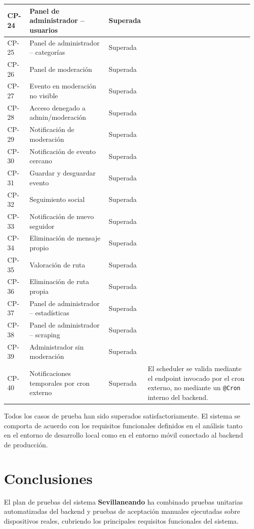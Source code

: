\begin{longtable}{|L{1.3cm}|L{4.5cm}|L{2.8cm}|L{6cm}|}
\hline
CP-24 & Panel de administrador -- usuarios & Superada & \\
\hline
CP-25 & Panel de administrador -- categorías & Superada & \\
\hline
CP-26 & Panel de moderación & Superada & \\
\hline
CP-27 & Evento en moderación no visible & Superada & \\
\hline
CP-28 & Acceso denegado a admin/moderación & Superada & \\
\hline
CP-29 & Notificación de moderación & Superada & \\
\hline
CP-30 & Notificación de evento cercano & Superada & \\
\hline
CP-31 & Guardar y desguardar evento & Superada & \\
\hline
CP-32 & Seguimiento social & Superada & \\
\hline
CP-33 & Notificación de nuevo seguidor & Superada & \\
\hline
CP-34 & Eliminación de mensaje propio & Superada & \\
\hline
CP-35 & Valoración de ruta & Superada & \\
\hline
CP-36 & Eliminación de ruta propia & Superada & \\
\hline
CP-37 & Panel de administrador -- estadísticas & Superada & \\
\hline
CP-38 & Panel de administrador -- scraping & Superada & \\
\hline
CP-39 & Administrador sin moderación & Superada & \\
\hline
CP-40 & Notificaciones temporales por cron externo & Superada & El scheduler se valida mediante el endpoint invocado por el cron externo, no mediante un \texttt{@Cron} interno del backend. \\
\hline
\end{longtable}

Todos los casos de prueba han sido superados satisfactoriamente. El sistema se comporta de acuerdo con los requisitos funcionales definidos en el análisis tanto en el entorno de desarrollo local como en el entorno móvil conectado al backend de producción.

\section{Conclusiones}

El plan de pruebas del sistema \textbf{Sevillaneando} ha combinado pruebas unitarias automatizadas del backend y pruebas de aceptación manuales ejecutadas sobre dispositivos reales, cubriendo los principales requisitos funcionales del sistema.

